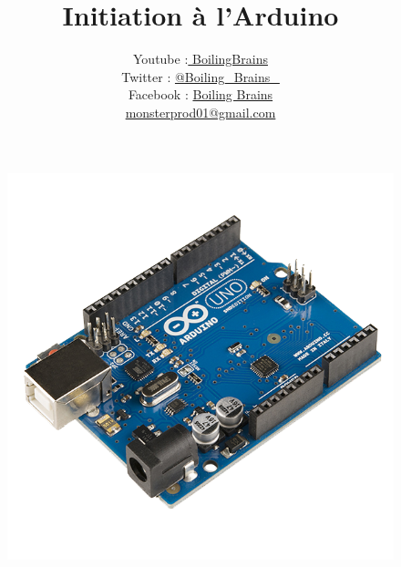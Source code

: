 \documentclass[12pt,a4paper]{article}
\begin{document}
\begin{titlepage}
\title{\vspace{-15mm}\fontsize{42pt}{10pt}\selectfont\textbf{Initiation à l'Arduino}} %

\author{
\large
\normalsize Youtube :\href{https://www.youtube.com/user/M0nsterPr0d}{ BoilingBrains }
\\
\normalsize Twitter :  \href{https://twitter.com/Boiling_Brains_}{ @Boiling\_Brains\_ }
\\
\normalsize Facebook :  \href{https://www.facebook.com/Boiling-Brains-995101330555512/?fref=ts}{Boiling Brains} 
\\
\normalsize \href{mailto:monsterprod01@gmail.com}{monsterprod01@gmail.com} %
\vspace{-5mm}
}
\date{}


\begin{figure}
    \centering
    \includegraphics[scale=1.7]{pagegarde.png}
\end{figure}

\end{titlepage}

\maketitle %
\end{document}
